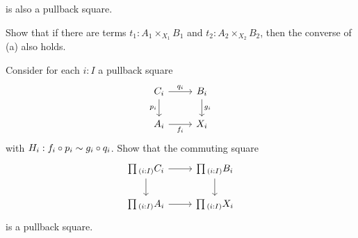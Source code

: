 \begin{exercises}
\begin{subexenum}
is also a pullback square.
\item Show that if there are terms $t_1:A_1\times_{X_1}B_1$ and $t_2:A_2\times_{X_2}B_2$, then the converse of (a) also holds.
\end{subexenum}
\exercise Consider for each $i:I$ a pullback square
\begin{equation*}
\begin{tikzcd}
C_i \arrow[r,"q_i"] \arrow[d,swap,"p_i"] & B_i \arrow[d,"g_i"] \\
A_i \arrow[r,swap,"f_i"] & X_i
\end{tikzcd}
\end{equation*}
with $H_i: f_i\circ p_i\sim g_i\circ q_i$.\label{ex:pb_pi}
Show that the commuting square
\begin{equation*}
\begin{tikzcd}
\prd{i:I}C_i \arrow[r] \arrow[d] & \prd{i:I}B_i \arrow[d] \\
\prd{i:I}A_i \arrow[r] & \prd{i:I}X_i
\end{tikzcd}
\end{equation*}
is a pullback square.

\end{exercises}
